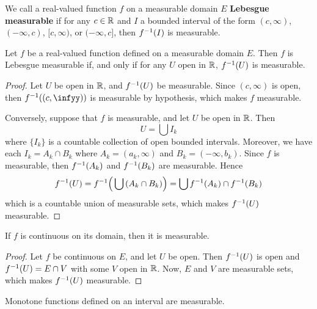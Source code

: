\begin{definition}
    We call a real-valued function $f$ on a measurable domain $E$
    \textbf{Lebesgue measurable} if for any $c \in \mathbb{R}$ and $I$ a bounded
    interval of the form  $(c,\infty)$, $(-\infty,c)$, $[c,\infty)$, or
    $(-\infty,c]$, then $f^{-1}(I)$ is measurable.
\end{definition}

\begin{lemma}\label{9.1.2}
    Let $f$ be a real-valued function defined on a measurable domain  $E$. Then
    $f$ is Lebesgue measurable if, and only if for any  $U$ open in $\mathbb{R}$,
    $f^{-1}(U)$ is measurable.
\end{lemma}
\begin{proof}
    Let $U$ be open in  $\mathbb{R}$, and $f^{-1}(U)$ be measurable. Since $(c,\infty)$
    is open, then $\inv{f}((c,\infyy))$ is measurable by hypothesis, which makes
    $f$ measurable.

    Conversely, suppose that $f$ is measurable, and let  $U$ be open in  $\mathbb{R}$.
    Then
    \begin{equation*}
        U=\bigcup{I_k}
    \end{equation*}
    where $\{I_k\}$ is a countable collection of open bounded intervals.
    Moreover, we have each $I_k=A_k \cap B_k$ where  $A_k=(a_k,\infty)$ and
    $B_k=(-\infty,b_k)$. Since $f$ is measurable, then  $f^{-1}(A_k)$ and
    $f^{-1}(B_k)$ are measurable. Hence
    \begin{equation*}
        f^{-1}(U)=f^{-1}\Big{(} \bigcup{(A_k \cap B_k)} \Big{)}=
        \bigcup{f^{-1}(A_k) \cap f^{-1}(B_k)}
    \end{equation*}
    which is a countable union of measurable sets, which makes $f^{-1}(U)$
    measurable.
\end{proof}
\begin{corollary}
    If $f$ is continuous on its domain, then it is measurable.
\end{corollary}
\begin{proof}
    Let $f$ be continuous on $E$, and let $U$ be open. Then  $f^{-1}(U)$ is
    open and $f^{-1}(U)=E \cap V$ with some $V$ open in  $\mathbb{R}$. Now, $E$ and $V$
    are measurable sets, which makes  $f^{-1}(U)$ measurable.
\end{proof}

\begin{lemma}\label{9.1.3}
    Monotone functions defined on an interval are measurable.
\end{lemma}

